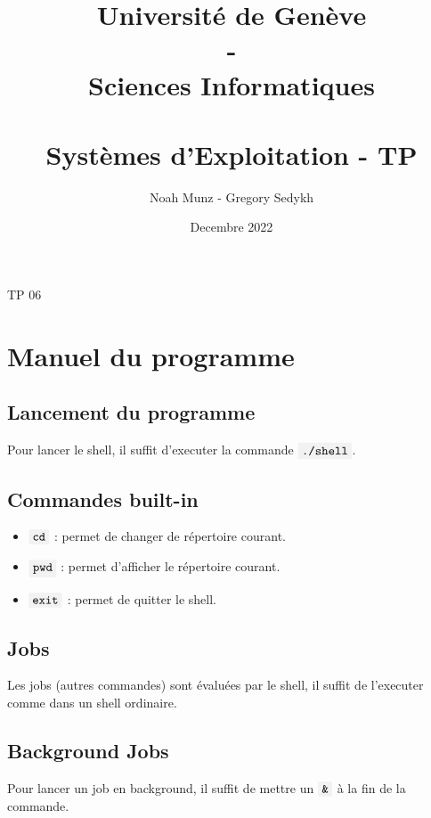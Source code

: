 \documentclass[french]{article}
\title{\vspace{-2.5cm}
   {\huge Université de Genève \\ - \\ Sciences Informatiques} \\
    \vspace{0.6cm}
    \unilogo{0.38} \\
    \vspace{1.1cm}
    {\huge Systèmes d'Exploitation - TP \nb}
    \vspace{0.1cm}
}
\author{Noah Munz - Gregory Sedykh}
\date{Decembre 2022}
\newcommand{\code}[1]{$\mbox{\colorbox{light-gray}{\texttt{#1}}}$}
\newcommand{\nb}{06}
\begin{document}
%
\maketitle
\vspace{0.3cm}
\thispagestyle{empty}
\clearpage
\setcounter{page}{1}
%
%
\begin{center}
{\huge TP \nb}
\end{center}
\vspace{0.3cm}

\section*{Manuel du programme}

\subsection*{Lancement du programme}
Pour lancer le shell, il suffit d'executer la commande \code{./shell}.

\subsection*{Commandes built-in}
\begin{itemize}
    \item \code{cd} : permet de changer de répertoire courant.
    \item \code{pwd} : permet d'afficher le répertoire courant.
    \item \code{exit} : permet de quitter le shell.
\end{itemize}

\subsection*{Jobs}
Les jobs (autres commandes) sont évaluées par le shell, il suffit de l'executer comme dans un shell ordinaire.

\subsection*{Background Jobs}
Pour lancer un job en background, il suffit de mettre un \code{\&} à la fin de la commande.

\end{document}
